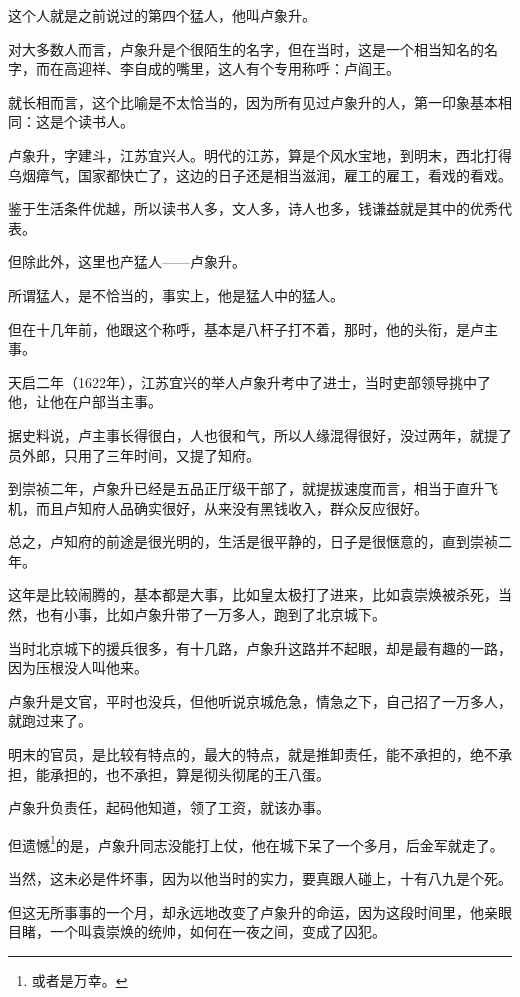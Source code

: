\begin{multicols}{\theparacolNo}
		这个人就是之前说过的第四个猛人，他叫卢象升。

		对大多数人而言，卢象升是个很陌生的名字，但在当时，这是一个相当知名的名字，而在高迎祥、李自成的嘴里，这人有个专用称呼：卢阎王。

		就长相而言，这个比喻是不太恰当的，因为所有见过卢象升的人，第一印象基本相同：这是个读书人。

		卢象升，字建斗，江苏宜兴人。明代的江苏，算是个风水宝地，到明末，西北打得乌烟瘴气，国家都快亡了，这边的日子还是相当滋润，雇工的雇工，看戏的看戏。

		鉴于生活条件优越，所以读书人多，文人多，诗人也多，钱谦益就是其中的优秀代表。

		但除此外，这里也产猛人——卢象升。

		所谓猛人，是不恰当的，事实上，他是猛人中的猛人。

		但在十几年前，他跟这个称呼，基本是八杆子打不着，那时，他的头衔，是卢主事。

		天启二年（1622年），江苏宜兴的举人卢象升考中了进士，当时吏部领导挑中了他，让他在户部当主事。

		据史料说，卢主事长得很白，人也很和气，所以人缘混得很好，没过两年，就提了员外郎，只用了三年时间，又提了知府。

		到崇祯二年，卢象升已经是五品正厅级干部了，就提拔速度而言，相当于直升飞机，而且卢知府人品确实很好，从来没有黑钱收入，群众反应很好。

		总之，卢知府的前途是很光明的，生活是很平静的，日子是很惬意的，直到崇祯二年。

		这年是比较闹腾的，基本都是大事，比如皇太极打了进来，比如袁崇焕被杀死，当然，也有小事，比如卢象升带了一万多人，跑到了北京城下。

		当时北京城下的援兵很多，有十几路，卢象升这路并不起眼，却是最有趣的一路，因为压根没人叫他来。

		卢象升是文官，平时也没兵，但他听说京城危急，情急之下，自己招了一万多人，就跑过来了。

		明末的官员，是比较有特点的，最大的特点，就是推卸责任，能不承担的，绝不承担，能承担的，也不承担，算是彻头彻尾的王八蛋。

		卢象升负责任，起码他知道，领了工资，就该办事。

		但遗憾\footnote{或者是万幸。}的是，卢象升同志没能打上仗，他在城下呆了一个多月，后金军就走了。

		当然，这未必是件坏事，因为以他当时的实力，要真跟人碰上，十有八九是个死。

		但这无所事事的一个月，却永远地改变了卢象升的命运，因为这段时间里，他亲眼目睹，一个叫袁崇焕的统帅，如何在一夜之间，变成了囚犯。


\end{multicols}
